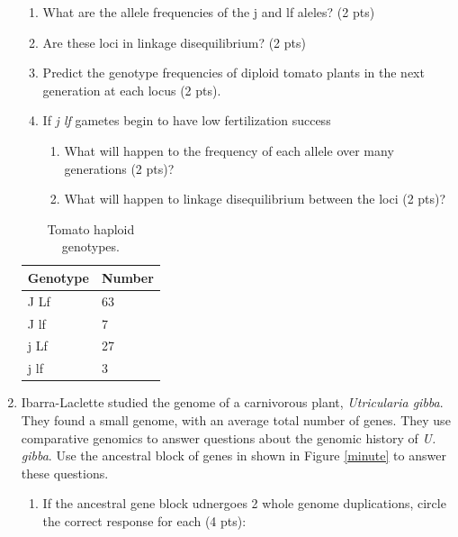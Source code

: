 \documentclass[]{article}
\begin{document}
\begin{enumerate}
\begin{enumerate}
\item What are the allele frequencies of the j and lf aleles? (2 pts) 
\item Are these loci in linkage disequilibrium? (2 pts)
\item Predict the genotype frequencies of diploid tomato plants in the next generation at each locus (2 pts).
\item If \emph{j lf} gametes begin to have low fertilization success
\begin{enumerate}
\item What will happen to the frequency of each allele over many generations (2 pts)?
\item What will happen to linkage disequilibrium between the loci (2 pts)?
\end{enumerate} 
\end{enumerate}

\begin{table}[h]
\caption[]{Tomato haploid genotypes.}
\begin{center}
\begin{tabular}{ll}
Genotype & Number \\  \hline
J Lf & 63\\  
J lf & 7\\
j Lf & 27\\
j lf & 3\\

\end{tabular}
\end{center}
\label{tomaters}
\end{table}

\newpage
\item Ibarra-Laclette studied the genome of a carnivorous plant, \emph{Utricularia gibba}.  They found a small genome, with an average total number of genes.  They use comparative genomics to answer questions about the genomic history of \emph{U. gibba}.  Use the ancestral block of genes in shown in Figure \ref{minute} to answer these questions.

\begin{enumerate}
\item If the ancestral gene block udnergoes 2 whole genome duplications, circle the correct response for each (4 pts):\\


\end{enumerate}
\end{enumerate}
\end{document}
